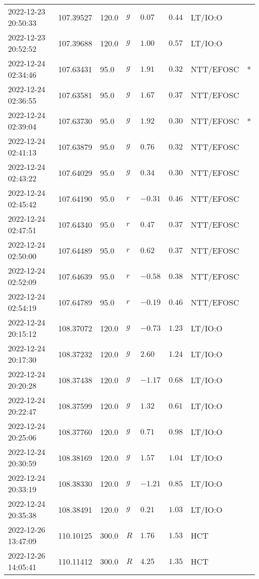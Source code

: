 \documentclass{nature_plusfigure}
\begin{document}
\begin{supplement}
\begin{center}
\begin{longtable}{llllllll}
2022-12-23 20:50:33 & 107.39527 & 120.0 & $g$ & $0.07$ & $0.44$ & LT/IO:O &  \\ 
2022-12-23 20:52:52 & 107.39688 & 120.0 & $g$ & $1.00$ & $0.57$ & LT/IO:O &  \\ 
2022-12-24 02:34:46 & 107.63431 & 95.0 & $g$ & $1.91$ & $0.32$ & NTT/EFOSC & * \\ 
2022-12-24 02:36:55 & 107.63581 & 95.0 & $g$ & $1.67$ & $0.37$ & NTT/EFOSC &  \\ 
2022-12-24 02:39:04 & 107.63730 & 95.0 & $g$ & $1.92$ & $0.30$ & NTT/EFOSC & * \\ 
2022-12-24 02:41:13 & 107.63879 & 95.0 & $g$ & $0.76$ & $0.32$ & NTT/EFOSC &  \\ 
2022-12-24 02:43:22 & 107.64029 & 95.0 & $g$ & $0.34$ & $0.30$ & NTT/EFOSC &  \\ 
2022-12-24 02:45:42 & 107.64190 & 95.0 & $r$ & $-0.31$ & $0.46$ & NTT/EFOSC &  \\ 
2022-12-24 02:47:51 & 107.64340 & 95.0 & $r$ & $0.47$ & $0.37$ & NTT/EFOSC &  \\ 
2022-12-24 02:50:00 & 107.64489 & 95.0 & $r$ & $0.62$ & $0.37$ & NTT/EFOSC &  \\ 
2022-12-24 02:52:09 & 107.64639 & 95.0 & $r$ & $-0.58$ & $0.38$ & NTT/EFOSC &  \\ 
2022-12-24 02:54:19 & 107.64789 & 95.0 & $r$ & $-0.19$ & $0.46$ & NTT/EFOSC &  \\ 
2022-12-24 20:15:12 & 108.37072 & 120.0 & $g$ & $-0.73$ & $1.23$ & LT/IO:O &  \\ 
2022-12-24 20:17:30 & 108.37232 & 120.0 & $g$ & $2.60$ & $1.24$ & LT/IO:O &  \\ 
2022-12-24 20:20:28 & 108.37438 & 120.0 & $g$ & $-1.17$ & $0.68$ & LT/IO:O &  \\ 
2022-12-24 20:22:47 & 108.37599 & 120.0 & $g$ & $1.32$ & $0.61$ & LT/IO:O &  \\ 
2022-12-24 20:25:06 & 108.37760 & 120.0 & $g$ & $0.71$ & $0.98$ & LT/IO:O &  \\ 
2022-12-24 20:30:59 & 108.38169 & 120.0 & $g$ & $1.57$ & $1.04$ & LT/IO:O &  \\ 
2022-12-24 20:33:19 & 108.38330 & 120.0 & $g$ & $-1.21$ & $0.85$ & LT/IO:O &  \\ 
2022-12-24 20:35:38 & 108.38491 & 120.0 & $g$ & $0.21$ & $1.03$ & LT/IO:O &  \\ 
2022-12-26 13:47:09 & 110.10125 & 300.0 & $R$ & $1.76$ & $1.53$ & HCT &  \\ 
2022-12-26 14:05:41 & 110.11412 & 300.0 & $R$ & $4.25$ & $1.35$ & HCT &  \\ 

\end{longtable}
\end{center}
\end{supplement}
\end{document}
